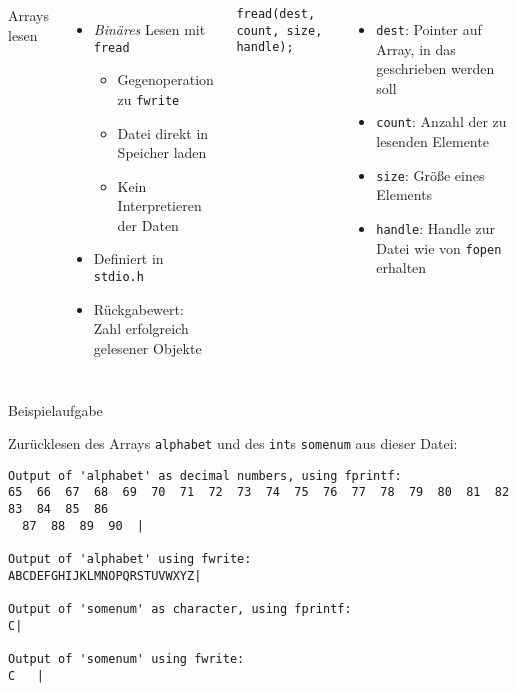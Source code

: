 \begin{frame}[fragile]
%
\begin{columns}[T]
\begin{Large}
Arrays lesen
\vspace{10pt}
\end{Large}
%
\begin{itemize}
\item \emph{Binäres} Lesen mit \texttt{fread}
\begin{itemize}
	\item Gegenoperation zu \texttt{fwrite}
	\item Datei direkt in Speicher laden
	\item Kein Interpretieren der Daten
\end{itemize}
\item Definiert in \texttt{stdio.h}
\item Rückgabewert: Zahl erfolgreich gelesener Objekte
\end{itemize}
%
\begin{codebox}[Syntax]
\begin{verbatim}
fread(dest, count, size, handle);
\end{verbatim}
\end{codebox}
%
\begin{itemize}
\item \texttt{dest}: Pointer auf Array, in das geschrieben werden soll
\item \texttt{count}: Anzahl der zu lesenden Elemente
\item \texttt{size}: Größe eines Elements
\item \texttt{handle}: Handle zur Datei wie von \texttt{fopen} erhalten
\end{itemize}
\end{columns}
%
\end{frame}


\begin{frame}[fragile]{Beispielaufgabe}
%
\begin{center}
Zurücklesen des Arrays \texttt{alphabet} und des \texttt{int}s \texttt{somenum} aus dieser Datei:
\end{center}
%
\begin{cmdbox}[Quelldatei]
\begin{verbatim}
Output of 'alphabet' as decimal numbers, using fprintf:
65  66  67  68  69  70  71  72  73  74  75  76  77  78  79  80  81  82  83  84  85  86
  87  88  89  90  |

Output of 'alphabet' using fwrite:
ABCDEFGHIJKLMNOPQRSTUVWXYZ|

Output of 'somenum' as character, using fprintf:
C|

Output of 'somenum' using fwrite:
C   |
\end{verbatim}
\end{cmdbox}
%
\end{frame}

